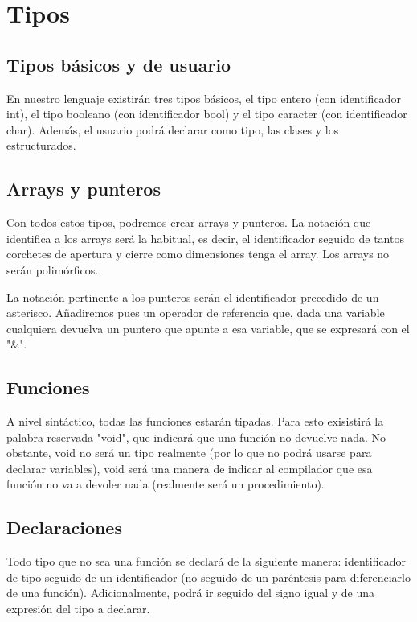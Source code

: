 \documentclass{article}
\begin{document}
\section{Tipos}

\subsection{Tipos básicos y de usuario}

En nuestro lenguaje existirán tres tipos básicos, el tipo entero (con identificador int), el tipo booleano (con identificador bool) y el tipo caracter (con identificador char). Además, el usuario podrá declarar como tipo, las clases y los estructurados.

\subsection{Arrays y punteros}
Con todos estos tipos, podremos crear arrays y punteros. La notación que identifica a los arrays será la habitual, es decir, el identificador seguido de tantos corchetes de apertura y cierre como dimensiones tenga el array. Los arrays no serán polimórficos.

La notación pertinente a los punteros serán el identificador precedido de un asterisco. Añadiremos pues un operador de referencia que, dada una variable cualquiera devuelva un puntero que apunte a esa variable, que se expresará con el "\&".

\subsection{Funciones}

A nivel sintáctico, todas las funciones estarán tipadas. Para esto exisistirá la palabra reservada "void", que indicará que una función no devuelve nada. No obstante, void no será un tipo realmente (por lo que no podrá usarse para declarar variables), void será una manera de indicar al compilador que esa función no va a devoler nada (realmente será un procedimiento).

\subsection{Declaraciones}

Todo tipo que no sea una función se declará de la siguiente manera: identificador de tipo seguido de un identificador (no seguido de un paréntesis para diferenciarlo de una función). Adicionalmente, podrá ir seguido del signo igual y de una expresión del tipo a declarar. 
\end{document}

